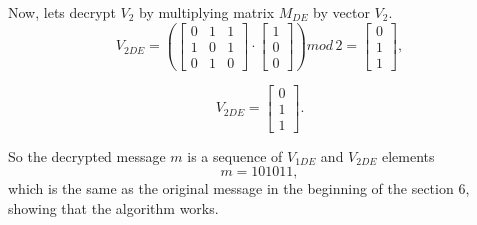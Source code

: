 \documentclass{article}
\begin{document}
        Now, lets decrypt $V_2$ by multiplying matrix $M_{DE}$ by vector $V_2$.
        $$
        V_{2DE}=
        \left(
        \begin{bmatrix}
        0 & 1 & 1 \\
        1 & 0 & 1 \\
        0 & 1 & 0
        \end{bmatrix} \cdot
        \begin{bmatrix}
        1  \\
        0  \\
        0  
        \end{bmatrix}
        \right)
        mod \, 2
        =
        \begin{bmatrix}
        0  \\
        1  \\
        1  
        \end{bmatrix},
        $$
        
        $$
        V_{2DE}=\begin{bmatrix}
        0  \\
        1  \\
        1  
        \end{bmatrix}.$$
        \vspace{5mm}
        
        So the decrypted message $m$ is a sequence of $V_{1DE}$ and $V_{2DE}$ elements
        $$m = 101011,$$
        \indent which is the same as the original message in the beginning of the section 6, showing that the algorithm works.
        
\newpage
\printbibliography %
\end{document}
